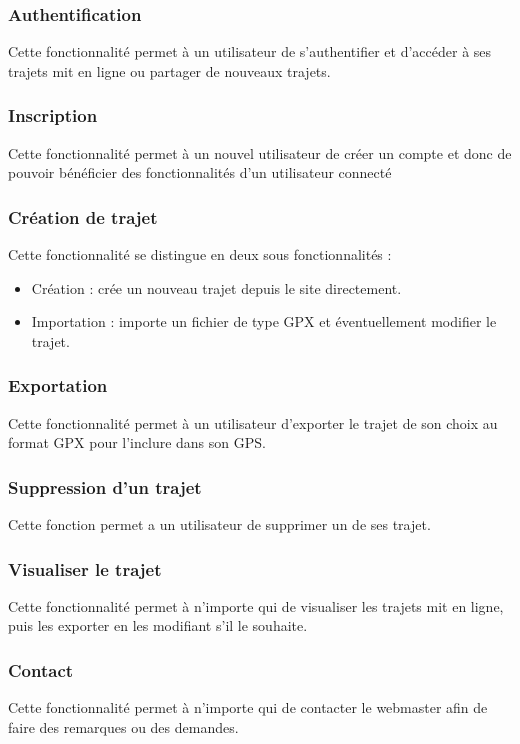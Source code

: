 \documentclass[a4paper]{article}
\begin{document}
\subsubsection{Authentification}
Cette fonctionnalité permet à un utilisateur de s'authentifier et d'accéder à ses trajets mit en ligne ou partager de nouveaux trajets.

\subsubsection{Inscription}
Cette fonctionnalité permet à un nouvel utilisateur de créer un compte et donc de pouvoir bénéficier des fonctionnalités d'un utilisateur connecté

\subsubsection{Création de trajet}
Cette fonctionnalité se distingue en deux sous fonctionnalités : 
\begin{itemize}
    \item Création : crée un nouveau trajet depuis le site directement.
    \item Importation : importe un fichier de type GPX et éventuellement modifier le trajet.
\end{itemize}

\subsubsection{Exportation}
Cette fonctionnalité permet à un utilisateur d'exporter le trajet de son choix au format GPX pour l'inclure dans son GPS.

\subsubsection{Suppression d'un trajet}
Cette fonction permet a un utilisateur de supprimer un de ses trajet.

\subsubsection{Visualiser le trajet}
Cette fonctionnalité permet à n'importe qui de visualiser les trajets mit en ligne, puis les exporter en les modifiant s'il le souhaite.

\subsubsection{Contact}
Cette fonctionnalité permet à n'importe qui de contacter le webmaster afin de faire des remarques ou des demandes.
\end{document}
